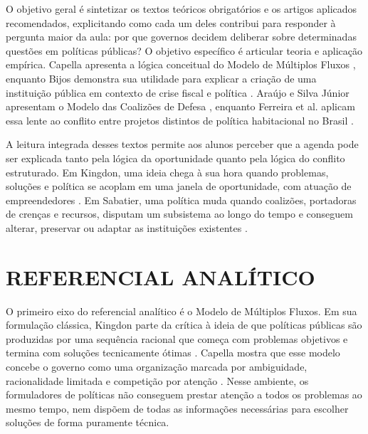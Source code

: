 \documentclass[12pt,a4paper]{article}
\begin{document}
O objetivo geral é sintetizar os textos teóricos obrigatórios e os artigos aplicados recomendados, explicitando como cada um deles contribui para responder à pergunta maior da aula: por que governos decidem deliberar sobre determinadas questões em políticas públicas? O objetivo específico é articular teoria e aplicação empírica. Capella apresenta a lógica conceitual do Modelo de Múltiplos Fluxos \autocite{capella2022multiplos}, enquanto Bijos demonstra sua utilidade para explicar a criação de uma instituição pública em contexto de crise fiscal e política \autocite{bijos2024ifi}. Araújo e Silva Júnior apresentam o Modelo das Coalizões de Defesa \autocite{araujoSilva2022coalizoes}, enquanto Ferreira et al. aplicam essa lente ao conflito entre projetos distintos de política habitacional no Brasil \autocite{ferreira2019habitacional}.

A leitura integrada desses textos permite aos alunos perceber que a agenda pode ser explicada tanto pela lógica da oportunidade quanto pela lógica do conflito estruturado. Em Kingdon, uma ideia chega à sua hora quando problemas, soluções e política se acoplam em uma janela de oportunidade, com atuação de empreendedores \autocite{kingdon2003agendas}. Em Sabatier, uma política muda quando coalizões, portadoras de crenças e recursos, disputam um subsistema ao longo do tempo e conseguem alterar, preservar ou adaptar as instituições existentes \autocite{sabatier1999theories}.

\section{REFERENCIAL ANALÍTICO}
\label{sec:org69e90fd}
O primeiro eixo do referencial analítico é o Modelo de Múltiplos Fluxos. Em sua formulação clássica, Kingdon parte da crítica à ideia de que políticas públicas são produzidas por uma sequência racional que começa com problemas objetivos e termina com soluções tecnicamente ótimas \autocite{kingdon2003agendas}. Capella mostra que esse modelo concebe o governo como uma organização marcada por ambiguidade, racionalidade limitada e competição por atenção \autocite{capella2022multiplos}. Nesse ambiente, os formuladores de políticas não conseguem prestar atenção a todos os problemas ao mesmo tempo, nem dispõem de todas as informações necessárias para escolher soluções de forma puramente técnica.
\end{document}
